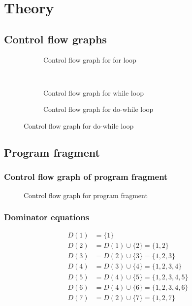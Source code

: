 \section{Theory}

\subsection{Control flow graphs}
\begin{figure}[h]
    \begin{subfigure}{0.5\textwidth}
        \centering
        
        \caption{Control flow graph for for loop}
        \label{fig:cfg_for}
    \end{subfigure}%
    ~
    \begin{subfigure}{0.5\textwidth}
        \centering
        
        \caption{Control flow graph for while loop}
        \label{fig:cfg_while}
    \end{subfigure}
    \par\bigskip\medskip
    \centering
    \begin{subfigure}{0.5\textwidth}
        \centering
        
        \caption{Control flow graph for do-while loop}
        \label{fig:cfg_do_while}
    \end{subfigure}
\end{figure}


\newpage
\subsection{Program fragment}
\subsubsection{Control flow graph of program fragment}
\begin{figure}[h]
    \centering
    
    \caption{Control flow graph for program fragment}
    \label{fig:cfg_program}
\end{figure}

\subsubsection{Dominator equations}\label{sec:dom_eq}
\begin{subequations}
    \begin{align}
        D(1) &= \{1\}\\
        D(2) &= D(1) \cup \{2\} = \{1,2\}\\
        D(3) &= D(2) \cup \{3\} = \{1,2,3\}\\
        D(4) &= D(3) \cup \{4\} = \{1,2,3,4\}\\
        D(5) &= D(4) \cup \{5\} = \{1,2,3,4,5\}\\
        D(6) &= D(4) \cup \{6\} = \{1,2,3,4,6\}\\
        D(7) &= D(2) \cup \{7\} = \{1,2,7\}
    \end{align}
\end{subequations}

